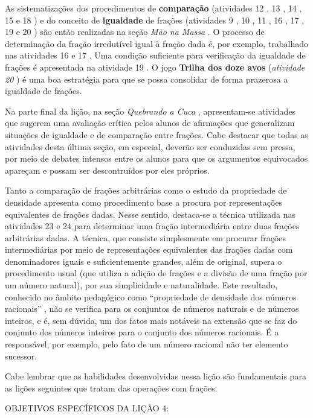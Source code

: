   As sistematizações dos procedimentos de   {\bf comparação}   (atividades 12  , 
13  , 14  , 15   e 18  ) e do conceito de   {\bf igualdade}   de frações 
(atividades 9  , 10  , 11  , 16  , 17  , 19   e 20  ) são então realizadas na 
seção   {\it Mão na Massa}  . O processo de determinação da fração irredutível 
igual à fração dada é, por exemplo, trabalhado nas atividades 16   e 17  . Uma 
condição suficiente para verificação da igualdade de frações é apresentada na 
atividade 19  . O jogo   {\bf Trilha dos doze avos}   (\emph{atividade 20}  ) é 
uma boa estratégia para que se possa consolidar de forma prazerosa a igualdade 
de frações.   
  
  Na parte final da lição, na seção   {\it Quebrando a Cuca}  , apresentam-se 
atividades que sugerem uma avaliação crítica pelos alunos de afirmações que 
generalizam situações de igualdade e de comparação entre frações. Cabe destacar 
que todas as atividades desta última seção, em especial, deverão ser conduzidas 
sem pressa, por meio de debates intensos entre os alunos para que os argumentos 
equivocados apareçam e possam ser descontruídos por eles próprios.  
  
  Tanto a comparação de frações arbitrárias como o estudo da propriedade de 
densidade apresenta como procedimento base a procura por representações 
equivalentes de frações dadas. Nesse sentido, destaca-se a técnica utilizada nas 
atividades 23   e 24   para determinar uma fração intermediária entre duas 
frações arbitrárias dadas. A técnica, que consiste simplesmente em procurar 
frações intermediárias por meio de representações equivalentes das frações dadas 
com denominadores iguais e suficientemente grandes, além de original, supera o 
procedimento usual (que utiliza a adição de frações e a divisão de uma fração 
por um número natural), por sua simplicidade e naturalidade. Este resultado, 
conhecido no âmbito pedagógico como   ``propriedade de densidade dos números 
racionais''  , não se verifica para os conjuntos de números naturais e de 
números inteiros, e é, sem dúvida, um dos fatos mais notáveis na extensão que se 
faz do conjunto dos números inteiros para o conjunto dos números racionais.  É a 
responsável, por exemplo, pelo fato de um número racional não ter elemento 
sucessor.   
  
  Cabe lembrar que as habilidades desenvolvidas nessa lição são fundamentais 
para as lições seguintes que tratam das operações com frações.  
  \vspace{.15cm}

\noindent OBJETIVOS ESPECÍFICOS DA LIÇÃO 4:
\vspace{.15cm}

